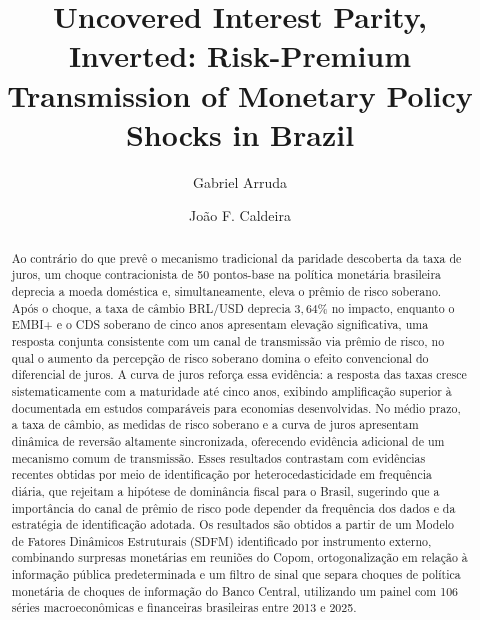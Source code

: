 \documentclass[preprint,authoryear,review,12pt]{elsarticle}
\begin{document}
\begin{frontmatter}
\title{Uncovered Interest Parity, Inverted: Risk-Premium Transmission of Monetary Policy Shocks in Brazil}



\author[Label0]{Gabriel Arruda}
\author[Label1]{Jo\~ao F. Caldeira }
\address[Label0]{Graduate School of Economics\\Universidade Federal de Santa Catarina}
\address[Label1]{Department of Economics\\Universidade de Brasília \& CNPq}

\begin{abstract}
Ao contrário do que prevê o mecanismo tradicional da paridade descoberta da taxa de juros, um choque contracionista de 50 pontos-base na política monetária brasileira deprecia a moeda doméstica e, simultaneamente, eleva o prêmio de risco soberano. Após o choque, a taxa de câmbio BRL/USD deprecia $3,\!64\%$ no impacto, enquanto o EMBI+ e o CDS soberano de cinco anos apresentam elevação significativa, uma resposta conjunta consistente com um canal de transmissão via prêmio de risco, no qual o aumento da percepção de risco soberano domina o efeito convencional do diferencial de juros. A curva de juros reforça essa evidência: a resposta das taxas cresce sistematicamente com a maturidade até cinco anos, exibindo amplificação superior à documentada em estudos comparáveis para economias desenvolvidas. No médio prazo, a taxa de câmbio, as medidas de risco soberano e a curva de juros apresentam dinâmica de reversão altamente sincronizada, oferecendo evidência adicional de um mecanismo comum de transmissão. Esses resultados contrastam com evidências recentes obtidas por meio de identificação por heterocedasticidade em frequência diária, que rejeitam a hipótese de dominância fiscal para o Brasil, sugerindo que a importância do canal de prêmio de risco pode depender da frequência dos dados e da estratégia de identificação adotada. Os resultados são obtidos a partir de um Modelo de Fatores Dinâmicos Estruturais (SDFM) identificado por instrumento externo, combinando surpresas monetárias em reuniões do Copom, ortogonalização em relação à informação pública predeterminada e um filtro de sinal que separa choques de política monetária de choques de informação do Banco Central, utilizando um painel com 106 séries macroeconômicas e financeiras brasileiras entre 2013 e 2025.\\


\end{abstract}
\end{frontmatter}
\end{document}
